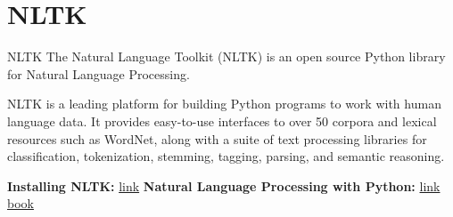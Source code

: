 \section{NLTK}

\begin{frame}[containsverbatim]{NLTK}
    The Natural Language Toolkit (NLTK) is an open source Python library for Natural Language Processing.
    
    NLTK is a leading platform for building Python programs to work with human language data. It provides easy-to-use interfaces to over 50 corpora and lexical resources such as WordNet, along with a suite of text processing libraries for classification, tokenization, stemming, tagging, parsing, and semantic reasoning.
    
    \textbf{Installing NLTK:} \href{https://www.nltk.org/install.html}{link} \newline
    \textbf{Natural Language Processing with Python:} \href{https://www.nltk.org/book/}{link book}  
\end{frame}

